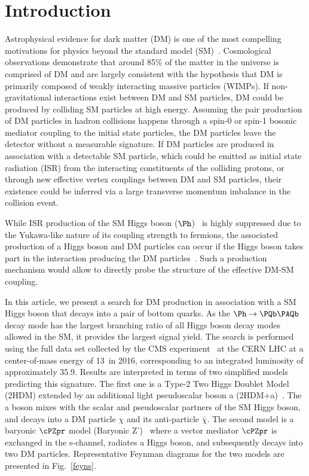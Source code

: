 \section{Introduction} \label{intro}

Astrophysical evidence for dark matter (DM) is one of the most compelling motivations for
physics beyond the standard model
(SM)~\cite{dm1,dm2,dm3}. Cosmological observations demonstrate that
around 85\% of the matter in the universe is comprised of DM
\cite{planck} and are largely consistent with the hypothesis that DM is primarily composed of
weakly interacting massive particles (WIMPs). If non-gravitational
interactions exist between DM and SM particles, DM could be produced
by colliding SM particles at high energy. Assuming the pair
production of DM particles in hadron collisions happens through a
spin-0 or spin-1 bosonic mediator coupling to the initial state particles, the DM particles leave the
detector without a measurable signature. If DM particles are produced in association with a detectable SM particle, which could be emitted
as initial state radiation (ISR) from the interacting constituents of the colliding protons, or through
new effective vertex couplings between DM and SM particles, their
existence could be inferred via a large transverse momentum imbalance in the collision event. 


While ISR production of the SM Higgs boson ($\Ph$)~\cite{HiggsObs_ATLAS, HiggsObs_CMS, HiggsObs_CMS_Long} is highly suppressed due to the Yukawa-like nature of its coupling strength to fermions, the associated production of a Higgs boson and DM particles
can occur if the
Higgs boson takes part in the interaction producing the DM particles~\cite{monoHiggs3,2HDM,PhysRevD.89.075017}.
Such a production mechanism would allow to directly probe the structure of the effective DM-SM coupling.

In this article, we  present a search for DM production in association
with a SM Higgs boson that decays into a pair of bottom quarks. As the 
$\Ph\rightarrow \bb$ decay mode has the largest branching ratio of all Higgs boson decay modes allowed in the SM, it provides the largest signal yield. The search is performed using the full data set collected by the CMS experiment~\cite{CMSdetector} at the CERN LHC at a center-of-mass energy of 13\TeV~in 2016, corresponding to an integrated luminosity of approximately 35.9\fbinv. Results are interpreted in terms of two simplified models predicting this signature. The first one is a Type-2 Two Higgs Doublet Model (2HDM) extended by an additional light pseudoscalar boson a (2HDM+a)~\cite{Bauer2017}. The a boson mixes with the scalar and pseudoscalar partners of the SM Higgs boson, and decays into a DM particle $\chi$ and its anti-particle $\bar{\chi}$. The second model is a baryonic $\cPZpr$ model (Baryonic Z')~\cite{PhysRevD.89.075017} where a vector mediator $\cPZpr$ is exchanged in the s-channel, radiates a Higgs boson, and subsequently decays into two DM 
particles. Representative Feynman diagrams for the two models are presented in Fig.~\ref{feyns}.



